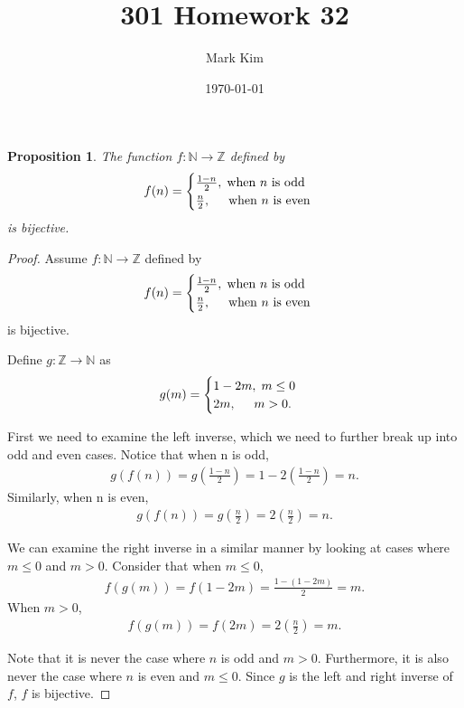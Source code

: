 \documentclass[12pt]{amsart}
\title{301 Homework 32}
\author{Mark Kim}
\date{\today}
\newcommand{\Z}{\mathbb{Z}}
\newcommand{\N}{\mathbb{N}}
\newtheorem*{proposition}{Proposition}
\begin{document}
\maketitle

\begin{proposition}
The function $f\colon \N\rightarrow\Z$ defined by
\begin{align*}
f(n) =
\begin{cases}
\frac{1-n}{2},\text{\hspace{.1cm}when $n$ is odd}\\
\frac{n}{2},\text{\hspace{.5cm}when $n$ is even}
\end{cases}
\end{align*}
is bijective.
\end{proposition}

\begin{proof}
Assume $f\colon \N\rightarrow\Z$ defined by
\begin{align*}
f(n) =
\begin{cases}
\frac{1-n}{2},\text{\hspace{.1cm}when $n$ is odd}\\
\frac{n}{2},\text{\hspace{.5cm}when $n$ is even}
\end{cases}
\end{align*}
is bijective.

Define $g\colon\Z\rightarrow\N$ as
\begin{align*}
g(m) =
\begin{cases}
1-2m,\text{\hspace{.1cm}}m\leq0\\
2m,\text{\hspace{.5cm}}m>0.
\end{cases}
\end{align*}

First we need to examine the left inverse, which we need to further break up into odd and even cases.  Notice that when n is odd,
\begin{align*}
g(f(n)) = g\left(\frac{1-n}{2}\right) = 1-2\left(\frac{1-n}{2}\right) = n.
\end{align*}
Similarly, when n is even,
\begin{align*}
g(f(n)) = g\left(\frac{n}{2}\right) = 2\left(\frac{n}{2}\right) = n.
\end{align*}

We can examine the right inverse in a similar manner by looking at cases where $m\leq0$ and $m>0$.  Consider that when $m\leq0$,
\begin{align*}
f(g(m)) = f\left(1-2m\right) = \frac{1-(1-2m)}{2} = m.
\end{align*}
When $m>0$,
\begin{align*}
f(g(m)) = f\left(2m\right) = 2\left(\frac{n}{2}\right) = m.
\end{align*}

Note that it is never the case where $n$ is odd and $m>0$.  Furthermore, it is also never the case where $n$ is even and $m\leq0$.  Since $g$ is the left and right inverse of $f$, $f$ is bijective.
\end{proof}
\end{document}
